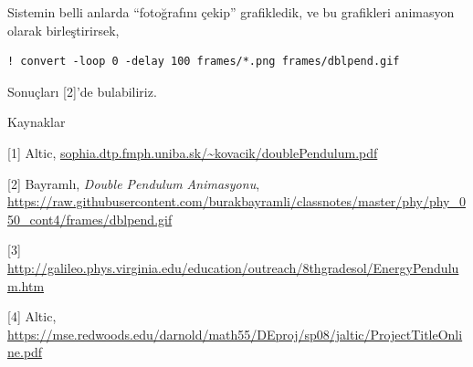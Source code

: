 \documentclass[12pt,fleqn]{article}\usepackage{../../common}
\begin{document}
Sistemin belli anlarda ``fotoğrafını çekip'' grafikledik, ve bu grafikleri
animasyon olarak birleştirirsek,

\begin{verbatim}
! convert -loop 0 -delay 100 frames/*.png frames/dblpend.gif
\end{verbatim}

Sonuçları [2]'de bulabiliriz. 

Kaynaklar

[1] Altic, \url{sophia.dtp.fmph.uniba.sk/~kovacik/doublePendulum.pdf}

[2] Bayramlı, {\em Double Pendulum Animasyonu}, \url{https://raw.githubusercontent.com/burakbayramli/classnotes/master/phy/phy_050_cont4/frames/dblpend.gif}

[3] \url{http://galileo.phys.virginia.edu/education/outreach/8thgradesol/EnergyPendulum.htm}

[4] Altic, \url{https://mse.redwoods.edu/darnold/math55/DEproj/sp08/jaltic/ProjectTitleOnline.pdf}
\end{document}
